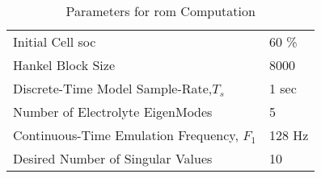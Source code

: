 \newpage
\singlespacing
\begin{table}[h]
	\begin{center}
		\caption{Parameters for \gls{rom} Computation}
		\label{table:simparams}
		\begin{tabular}{ l l }
			\hline
			Initial Cell \gls{soc} & 60 \%  \\
			Hankel Block Size & 8000 \\
			Discrete-Time Model Sample-Rate,$T_s$ & 1 sec  \\
			Number of Electrolyte EigenModes & 5 \\
			Continuous-Time Emulation Frequency, $F_1$ & 128 Hz \\
			Desired Number of Singular Values &	10 \\
			\hline
		\end{tabular}
	\end{center}
\end{table}

\newpage
\singlespacing

